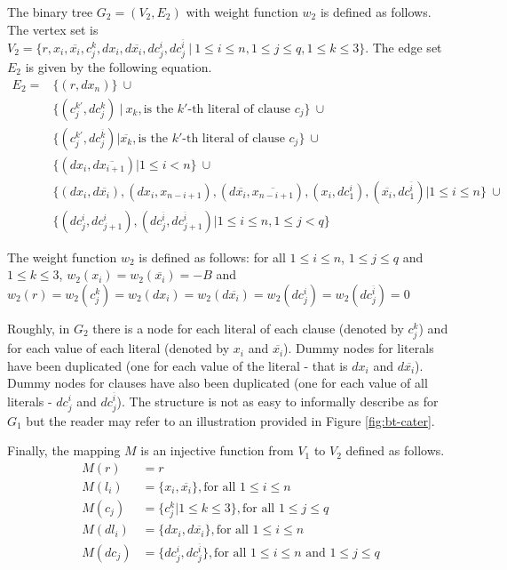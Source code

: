 		The binary tree $G_2=(V_2,E_2)$ with weight function $w_2$ is defined as follows. The vertex set is $V_2=\{r, x_i, \overline{x_i}, c^k_j, dx_i, d\overline{x_i}, dc^i_j, dc^{\overline{i}}_j ~\vert~ 1\leq i\leq n, 1\leq j \leq q, 1\leq k\leq 3\}$. The edge set $E_2$ is given by the following equation.
		\begin{align*} E_2 = &\{(r,dx_n)\}~ \cup \\
			&\{(c^{k'}_j,dc^k_j) ~\vert~ x_k ,\text{is the } k' \text{-th literal of clause } c_j\}~ \cup \\
			&\{(c^{k'}_j,dc^{\overline{k}}_j) | \overline{x_k} ,\text{is the } k' \text{-th literal of clause } c_j\} ~\cup \\
			& \{ (dx_i,d\overline{x_{i+1}}) | 1\leq i < n\} ~\cup  \\
			& \{(dx_i,d\overline{x_i}), (dx_i, x_{n-i+1}), (d\overline{x_i},\overline{x_{n-i+1}}), (x_i,dc^i_1), (\overline{x_i},dc^{\overline{i}}_1) | 1 \leq i \leq n\}~ \cup  \\
			& \{(dc^i_j,dc^i_{j+1}), (dc^{\overline{i}}_j,dc^{\overline{i}}_{j+1}) | 1 \leq i \leq n, 1 \leq j < q\}
		\end{align*}

		The weight function $w_2$ is defined as follows:  for all $1\leq i\leq n$, $1\leq j \leq q$ and $1\leq k\leq 3$, $w_2(x_i)=w_2(\overline{x_i})=-B$ and $w_2(r)=w_2(c^k_j)=w_2(dx_i)=w_2(d\overline{x_i})=w_2(dc^i_j)=w_2(dc^{\overline{i}}_j)=0$ 

		Roughly, in $G_2$ there is a node for each literal of each clause (denoted by $c^k_j$) and for each value of each literal (denoted by $x_i$ and $\overline{x_i}$). Dummy nodes for literals have been duplicated (one for each value of the literal - that is $dx_i$ and $d\overline{x_i}$). Dummy nodes for clauses have also been duplicated (one for each value of all literals - $dc^i_j$ and $dc^{\overline{i}}_j$). The structure is not as easy to informally describe as for $G_1$ but the reader may refer to an illustration provided in Figure \ref{fig:bt-cater}.

		Finally, the mapping $M$ is an injective function from $V_1$ to $V_2$ defined as follows.
		\begin{align*}
			M(r)    &= r\\
			M(l_i)  &= \{x_i,\overline{x_i}\}, \text{for all } 1 \leq i\leq n\\
			M(c_j)  &= \{c^k_j|1\leq k\leq 3 \}, \text{for all } 1 \leq j \leq q\\
			M(dl_i) &= \{dx_i, d\overline{x_i}\}, \text{for all } 1 \leq i\leq n\\
			M(dc_j) &= \{dc^i_j, dc^{\overline{i}}_j\}, \text{for all } 1 \leq i\leq n \text{ and } 1 \leq j \leq q
		\end{align*}

